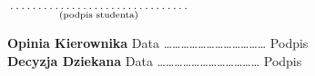 \documentclass[a4paper,11pt]{article}
\newcommand{\fillField}[2]{
    $\underset{\text{#1}}{\parbox[t]{#2}{\dotfill}}$
}
\begin{document}
\vskip 0.3cm

\hspace{\fill} \fillField{(podpis studenta)}{5cm} \hspace{2.0cm}
\vskip 1.0cm

\noindent
\textbf{Opinia Kierownika} \dotfill
\vskip 0.5cm
\noindent
Data ……………………………… Podpis \dotfill\\

\noindent
\textbf{Decyzja Dziekana} \dotfill
\vskip 0.5cm
\noindent
Data ……………………………… Podpis \dotfill
\end{document}

